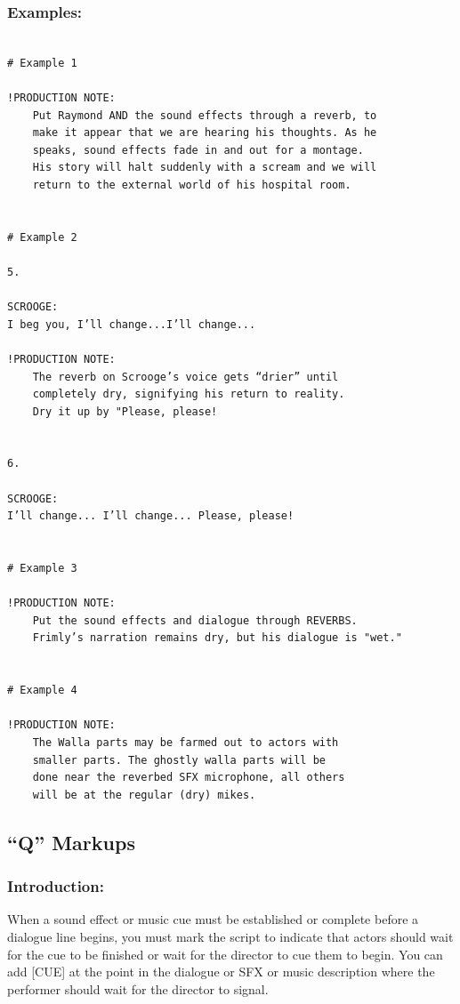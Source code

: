\documentclass[openleft,oneside,showtrims]{memoir}
\begin{document}
\subsubsection*{Examples:}
\label{sec:org99a0e59}

\lstset{language=fountain,label= ,caption= ,captionpos=b,numbers=none}
\begin{lstlisting}

# Example 1

!PRODUCTION NOTE:
    Put Raymond AND the sound effects through a reverb, to 
    make it appear that we are hearing his thoughts. As he 
    speaks, sound effects fade in and out for a montage. 
    His story will halt suddenly with a scream and we will 
    return to the external world of his hospital room.


# Example 2

5.

SCROOGE:
I beg you, I’ll change...I’ll change...

!PRODUCTION NOTE:
    The reverb on Scrooge’s voice gets “drier” until 
    completely dry, signifying his return to reality.
    Dry it up by "Please, please!


6.

SCROOGE:
I’ll change... I’ll change... Please, please!


# Example 3

!PRODUCTION NOTE:
    Put the sound effects and dialogue through REVERBS.
    Frimly’s narration remains dry, but his dialogue is "wet."


# Example 4

!PRODUCTION NOTE:
    The Walla parts may be farmed out to actors with 
    smaller parts. The ghostly walla parts will be 
    done near the reverbed SFX microphone, all others 
    will be at the regular (dry) mikes.

\end{lstlisting}
\subsection{``Q'' Markups}
\label{sec:org4eaf770}
\subsubsection*{Introduction:}
\label{sec:org9d89171}

When a sound effect or music cue must be established or complete before a dialogue line begins, you must mark the script to indicate that actors should wait for the cue to be finished or wait for the director to cue them to begin. You can add [CUE] at the point in the dialogue or SFX or music description where the performer should wait for the director to signal.
\end{document}
